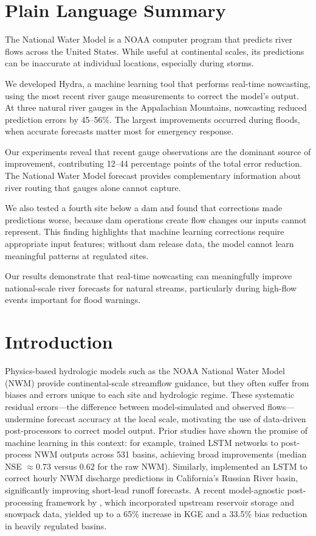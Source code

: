 \documentclass[draft]{agujournal2019}
\begin{document}
\section*{Plain Language Summary}
The National Water Model is a NOAA computer program that predicts river flows across the United States. While useful at continental scales, its predictions can be inaccurate at individual locations, especially during storms.

We developed Hydra, a machine learning tool that performs real-time nowcasting, using the most recent river gauge measurements to correct the model's output. At three natural river gauges in the Appalachian Mountains, nowcasting reduced prediction errors by 45--56\%. The largest improvements occurred during floods, when accurate forecasts matter most for emergency response.

Our experiments reveal that recent gauge observations are the dominant source of improvement, contributing 12--44 percentage points of the total error reduction. The National Water Model forecast provides complementary information about river routing that gauges alone cannot capture.

We also tested a fourth site below a dam and found that corrections made predictions worse, because dam operations create flow changes our inputs cannot represent. This finding highlights that machine learning corrections require appropriate input features; without dam release data, the model cannot learn meaningful patterns at regulated sites.

Our results demonstrate that real-time nowcasting can meaningfully improve national-scale river forecasts for natural streams, particularly during high-flow events important for flood warnings.


\section{Introduction}

Physics-based hydrologic models such as the NOAA National Water Model (NWM) provide continental-scale streamflow guidance, but they often suffer from biases and errors unique to each site and hydrologic regime. These systematic residual errors---the difference between model-simulated and observed flows---undermine forecast accuracy at the local scale, motivating the use of data-driven post-processors to correct model output. Prior studies have shown the promise of machine learning in this context: for example,  trained LSTM networks to post-process NWM outputs across 531 basins, achieving broad improvements (median NSE $\approx 0.73$ versus $0.62$ for the raw NWM). Similarly,  implemented an LSTM to correct hourly NWM discharge predictions in California's Russian River basin, significantly improving short-lead runoff forecasts. A recent model-agnostic post-processing framework by , which incorporated upstream reservoir storage and snowpack data, yielded up to a 65\% increase in KGE and a 33.5\% bias reduction in heavily regulated basins.
\end{document}
